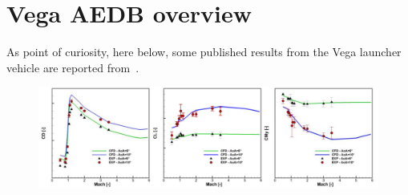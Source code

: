 \documentclass[12pt]{article}
\begin{document}
\newpage




\appendix
{}

\newpage

\section*{Vega AEDB overview}\label{sec:vega}
As point of curiosity, here below, some published results from the Vega launcher vehicle are reported from~\cite{roncioni2017preliminary,roncioni2019aerodatabase,roncioni2023aerodynamic,roncioni2024aerodatabase}.

\begin{figure}[H]
    \centering
    \includegraphics[width=0.95\linewidth]{figs/VEGA-ADB.png}
    \label{fig:vega-adb}
\end{figure}
\end{document}
